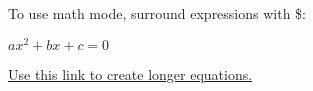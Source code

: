 \documentclass{uc-mse}
\begin{document}
To use math mode, surround expressions with \$:

$ ax^2 +bx+c=0 $


 \href{https://latex.codecogs.com/eqneditor/editor.php}{Use this link to create longer equations.}
\end{document}
